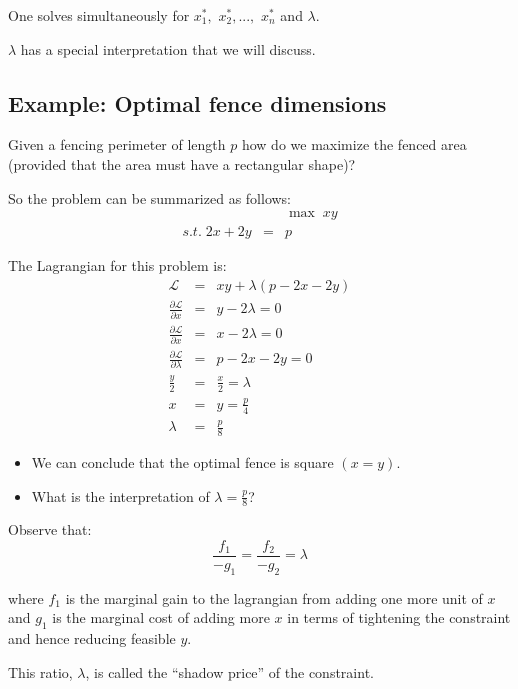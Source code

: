 \documentclass[11pt,english]{article}
\begin{document}
One solves simultaneously for $x_{1}^{\ast },$ $x_{2}^{\ast },...,$ $%
x_{n}^{\ast }$ and $\lambda $.

$\lambda $ has a special interpretation that we will discuss.

\bigskip

\subsection{Example: Optimal fence dimensions}

Given a fencing perimeter of length $p$ how do we maximize the fenced area
(provided that the area must have a rectangular shape)?

So the problem can be summarized as follows: 
\begin{eqnarray*}
&&\max \;xy \\
s.t.\;2x+2y &=&p
\end{eqnarray*}

The Lagrangian for this problem is: 
\begin{eqnarray*}
\mathcal{L} &=&xy+\lambda (p-2x-2y) \\
\frac{\partial \mathcal{L} }{\partial x} &=&y-2\lambda =0 \\
\frac{\partial \mathcal{L} }{\partial x} &=&x-2\lambda =0 \\
\frac{\partial \mathcal{L} }{\partial \lambda } &=&p-2x-2y=0 \\
\frac{y}{2} &=&\frac{x}{2}=\lambda \\
x &=&y=\frac{p}{4} \\
\lambda &=&\frac{p}{8}
\end{eqnarray*}

\begin{itemize}
\item We can conclude that the optimal fence is square $(x=y)$.

\item What is the interpretation of $\lambda =\frac{p}{8}$?
\end{itemize}

Observe that: 
\begin{equation*}
\frac{f_{1}}{-g_{1}}=\frac{f_{2}}{-g_{2}}=\lambda
\end{equation*}

where $f_{1}$ is the marginal gain to the lagrangian from adding one more
unit of $x$ and $g_{1}$ is the marginal cost of adding more $x$ in terms of
tightening the constraint and hence reducing feasible $y$.

This ratio, $\lambda $, is called the ``shadow price'' of the constraint.
\end{document}
